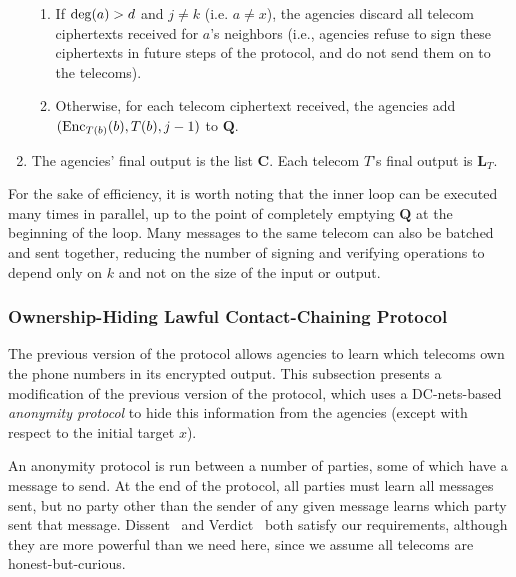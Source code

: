 \begin{enumerate}
\begin{enumerate}
\item If $\operatorname{deg}(a)>d$ and $j\neq k$ (i.e. $a\neq x$), the agencies discard all telecom ciphertexts received for $a$'s neighbors (i.e., agencies refuse to sign these ciphertexts in future steps of the protocol, and do not send them on to the telecoms).

\item Otherwise, for each telecom ciphertext received, the agencies add $(\operatorname{Enc}_{T(b)}(b), T(b), j-1)$ to $\mathbf{Q}$.

\end{enumerate}

\item The agencies' final output is the list $\mathbf{C}$. Each telecom $T$'s final output is $\mathbf{L}_T$.

\end{enumerate}



For the sake of efficiency, it is worth noting that the inner loop can be executed many times in parallel, up to the point of completely emptying $\mathbf{Q}$ at the beginning of the loop. Many messages to the same telecom can also be batched and sent together, reducing the number of signing and verifying operations to depend only on $k$ and not on the size of the input or output.



\subsubsection{Ownership-Hiding Lawful Contact-Chaining Protocol}

\label{sec:proto2}



The previous version of the protocol allows agencies to learn which telecoms own the phone numbers in its encrypted output. This subsection presents a modification of the previous version of the protocol, which uses a DC-nets-based \emph{anonymity protocol} to hide this information from the agencies (except with respect to the initial target $x$).



An anonymity protocol is run between a number of parties, some of which have a message to send. At the end of the protocol, all parties must learn all messages sent, but no party other than the sender of any given message learns which party sent that message. Dissent~\cite{dissent} and Verdict~\cite{verdict} both satisfy our requirements, although they are more powerful than we need here, since we assume all telecoms are honest-but-curious.



